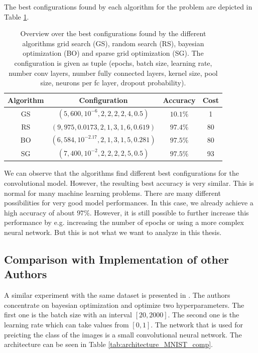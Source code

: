 The best configurations found by each algorithm for the problem are depicted in Table \ref{tab:best_configurations_MNIST}.

\begin{table}[htbp!]
	\caption{ Overview over the best configurations found by the different algorithms grid search (GS), random search (RS), bayesian optimization (BO) and sparse grid optimization (SG). The configuration is given as tuple (epochs, batch size, learning rate, number conv layers, number fully connected layers, kernel size, pool size, neurons per fc layer, dropout probability). }
	\label{tab:best_configurations_MNIST}
	\centering
	\begin{tabular}{| c c c c |} 
		\hline
		Algorithm & Configuration & Accuracy & Cost \\ 
		\hline
		GS & $ (5, 600, 10^{-6}, 2, 2, 2, 2, 4, 0.5) $ & $ 10.1\% $ & 1 \\ 
		RS & $ (9, 975, 0.0173, 2, 1, 3, 1, 6, 0.619) $ & $ 97.4\% $ & 80 \\ 
		BO & $ (6, 584, 10^{-2.17}, 2, 1, 3, 1, 5, 0.281) $ & $ 97.5\% $ & 80 \\ 
		SG & $ (7, 400, 10^{-2}, 2, 2, 2, 2, 5, 0.5) $ & $ 97.5\% $ & 93 \\ 
		\hline
	\end{tabular}
\end{table}

We can observe that the algorithms find different best configurations for the convolutional model. However, the resulting best accuracy is very similar. This is normal for many machine learning problems. There are many different possibilities for very good model performances. In this case, we already achieve a high accuracy of about $ 97\% $. However, it is still possible to further increase this performance by e.g. increasing the number of epochs or using a more complex neural network. But this is not what we want to analyze in this thesis. 

\subsection{Comparison with Implementation of other Authors}

A similar experiment with the same dataset is presented in \cite{WU201926}. The authors concentrate on bayesian optimization and optimize two hyperparameters. The first one is the batch size with an interval $ [20, 2000] $. The second one is the learning rate which can take values from $ [0,1] $. The network that is used for preicting the class of the images is a small convolutional neural network. The architecture can be seen in Table \ref{tab:architecture_MNIST_comp}.


